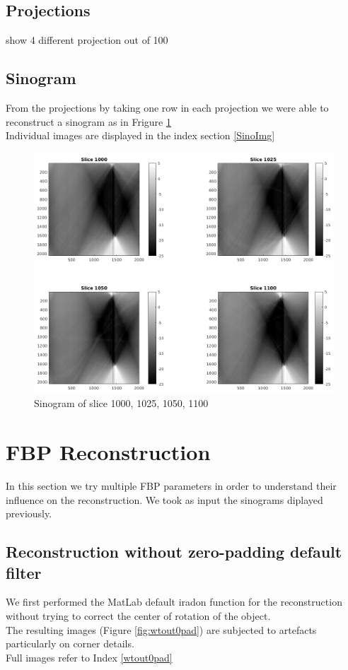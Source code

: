 \documentclass[10pt,a4paper,titlepage]{article}
\begin{document}
	\subsection{Projections}
		show 4 different projection out of 100
	\subsection{Sinogram}
		From the projections by taking one row in each projection we were able to reconstruct a sinogram as in Frigure \ref{fig:Sino}\\
		Individual images are displayed in the index section \ref{SinoImg}
		\begin{figure}[H]
    		\centering
		\includegraphics[width=1.1\textwidth]{sinograms/Sinograms2.png}	
			\caption{Sinogram of slice 1000, 1025, 1050, 1100}
    	\label{fig:Sino}
		
		\end{figure}

	\clearpage
\section{FBP Reconstruction}
	In this section we try multiple FBP parameters in order to understand their influence on the reconstruction. We took as input the sinograms diplayed previously.
	\subsection{Reconstruction without zero-padding default filter}
		We first performed the MatLab default iradon function for the reconstruction without trying to correct the center of rotation of the object.\\
		The resulting images (Figure \ref{fig:wtout0pad}) are subjected to artefacts particularly on corner details.\\
		 Full images refer to Index \ref{wtout0pad}
		 
\end{document}
